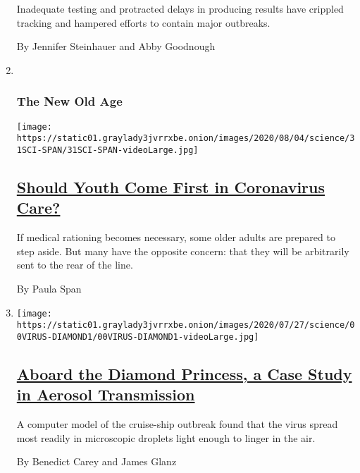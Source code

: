 \begin{enumerate}
  Inadequate testing and protracted delays in producing results have
  crippled tracking and hampered efforts to contain major outbreaks.

  By Jennifer Steinhauer and Abby Goodnough
\item ~
  \hypertarget{the-new-old-age}{%
  \subsubsection{The New Old Age}\label{the-new-old-age}}

  \texttt{[image: https://static01.graylady3jvrrxbe.onion/images/2020/08/04/science/31SCI-SPAN/31SCI-SPAN-videoLarge.jpg]}

  \hypertarget{should-youth-come-first-in-coronavirus-care}{%
  \subsection{\texorpdfstring{\href{/2020/07/31/health/coronavirus-ethics-rationing-elderly.html}{Should
  Youth Come First in Coronavirus
  Care?}}{Should Youth Come First in Coronavirus Care?}}\label{should-youth-come-first-in-coronavirus-care}}

  If medical rationing becomes necessary, some older adults are prepared
  to step aside. But many have the opposite concern: that they will be
  arbitrarily sent to the rear of the line.

  By Paula Span
\item
  \texttt{[image: https://static01.graylady3jvrrxbe.onion/images/2020/07/27/science/00VIRUS-DIAMOND1/00VIRUS-DIAMOND1-videoLarge.jpg]}

  \hypertarget{aboard-the-diamond-princess-a-case-study-in-aerosol-transmission}{%
  \subsection{\texorpdfstring{\href{/2020/07/30/health/diamond-princess-coronavirus-aerosol.html}{Aboard
  the Diamond Princess, a Case Study in Aerosol
  Transmission}}{Aboard the Diamond Princess, a Case Study in Aerosol Transmission}}\label{aboard-the-diamond-princess-a-case-study-in-aerosol-transmission}}

  A computer model of the cruise-ship outbreak found that the virus
  spread most readily in microscopic droplets light enough to linger in
  the air.

  By Benedict Carey and James Glanz
\end{enumerate}

